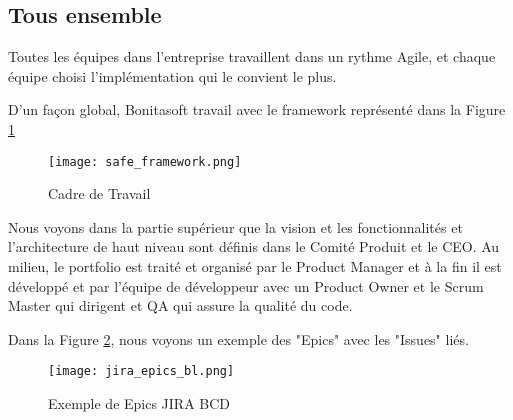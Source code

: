 \subsection{Tous ensemble}

Toutes les équipes dans l'entreprise travaillent dans un rythme Agile, et chaque équipe choisi l'implémentation qui le convient le plus.

D'un façon global, Bonitasoft travail avec le framework représenté dans la Figure \ref{frame_safe}

\begin{figure}[!ht]
\centering
\texttt{[image: safe\_framework.png]}
\caption{Cadre de Travail \cite{safe}}
\label{frame_safe}
\end{figure}

Nous voyons dans la partie supérieur que la vision et les fonctionnalités et l'architecture de haut niveau sont définis dans le Comité Produit et le CEO.
Au milieu, le portfolio est traité et organisé par le Product Manager et à la fin il est développé et par l'équipe de développeur avec un Product Owner et le Scrum Master qui dirigent et QA qui assure la qualité du code.

Dans la Figure \ref{fig:example_epic}, nous voyons un exemple des "Epics" avec les "Issues" liés.
\begin{figure}[!ht]
\centering
\texttt{[image: jira\_epics\_bl.png]}
\caption{Exemple de Epics JIRA BCD}
\label{fig:example_epic}
\end{figure}
